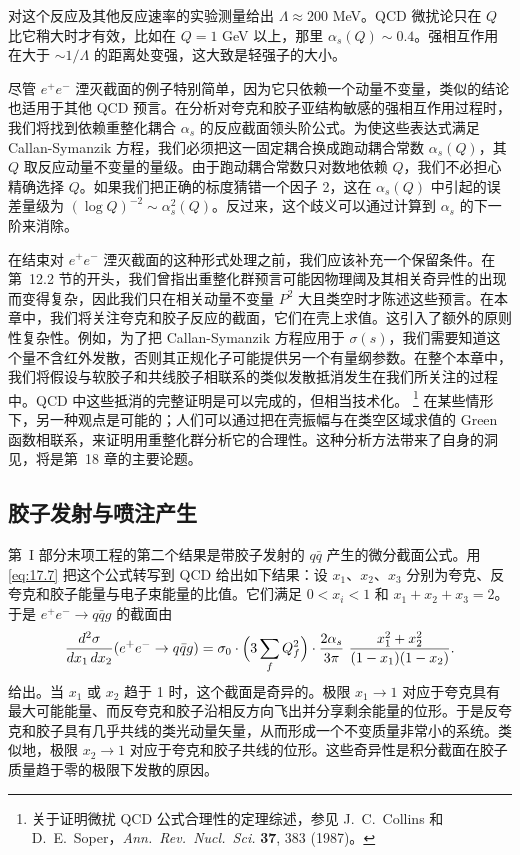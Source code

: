 对这个反应及其他反应速率的实验测量给出 $\Lambda \approx 200$ MeV。QCD 微扰论只在 $Q$ 比它稍大时才有效，比如在 $Q = 1$ GeV 以上，那里 $\alpha_s(Q) \sim 0.4$。强相互作用在大于 $\sim 1/\Lambda$ 的距离处变强，这大致是轻强子的大小。

尽管 $e^{+}e^{-}$ 湮灭截面的例子特别简单，因为它只依赖一个动量不变量，类似的结论也适用于其他 QCD 预言。在分析对夸克和胶子亚结构敏感的强相互作用过程时，我们将找到依赖重整化耦合 $\alpha_s$ 的反应截面领头阶公式。为使这些表达式满足 Callan-Symanzik 方程，我们必须把这一固定耦合换成跑动耦合常数 $\alpha_s(Q)$，其 $Q$ 取反应动量不变量的量级。由于跑动耦合常数只对数地依赖 $Q$，我们不必担心精确选择 $Q$。如果我们把正确的标度猜错一个因子 2，这在 $\alpha_s(Q)$ 中引起的误差量级为 $(\log Q)^{-2} \sim \alpha_s^2(Q)$。反过来，这个歧义可以通过计算到 $\alpha_s$ 的下一阶来消除。

在结束对 $e^{+}e^{-}$ 湮灭截面的这种形式处理之前，我们应该补充一个保留条件。在第~12.2 节的开头，我们曾指出重整化群预言可能因物理阈及其相关奇异性的出现而变得复杂，因此我们只在相关动量不变量 $P^2$ 大且类空时才陈述这些预言。在本章中，我们将关注夸克和胶子反应的截面，它们在壳上求值。这引入了额外的原则性复杂性。例如，为了把 Callan-Symanzik 方程应用于 $\sigma(s)$，我们需要知道这个量不含红外发散，否则其正规化子可能提供另一个有量纲参数。在整个本章中，我们将假设与软胶子和共线胶子相联系的类似发散抵消发生在我们所关注的过程中。QCD 中这些抵消的完整证明是可以完成的，但相当技术化。%
\footnote{关于证明微扰 QCD 公式合理性的定理综述，参见 J.~C.~Collins 和 D.~E.~Soper，\emph{Ann.\ Rev.\ Nucl.\ Sci.} \textbf{37}, 383 (1987)。} 在某些情形下，另一种观点是可能的；人们可以通过把在壳振幅与在类空区域求值的 Green 函数相联系，来证明用重整化群分析它的合理性。这种分析方法带来了自身的洞见，将是第~18 章的主要论题。

\subsection{胶子发射与喷注产生}

第~I 部分末项工程的第二个结果是带胶子发射的 $q\bar{q}$ 产生的微分截面公式。用 \eqref{eq:17.7} 把这个公式转写到 QCD 给出如下结果：设 $x_1$、$x_2$、$x_3$ 分别为夸克、反夸克和胶子能量与电子束能量的比值。它们满足 $0 < x_i < 1$ 和 $x_1 + x_2 + x_3 = 2$。于是 $e^{+}e^{-}\to q\bar{q}g$ 的截面由
\begin{equation}
  \frac{d^2\sigma}{dx_1\,dx_2}(e^{+}e^{-}\to q\bar{q}g)
  = \sigma_0\cdot\Bigl( 3\sum_f Q_f^2 \Bigr)\cdot
    \frac{2\alpha_s}{3\pi}\ \frac{x_1^2+x_2^2}{(1-x_1)(1-x_2)} .
  \label{eq:17.18}
\end{equation}
给出。当 $x_1$ 或 $x_2$ 趋于 1 时，这个截面是奇异的。极限 $x_1\to 1$ 对应于夸克具有最大可能能量、而反夸克和胶子沿相反方向飞出并分享剩余能量的位形。于是反夸克和胶子具有几乎共线的类光动量矢量，从而形成一个不变质量非常小的系统。类似地，极限 $x_2\to 1$ 对应于夸克和胶子共线的位形。这些奇异性是积分截面在胶子质量趋于零的极限下发散的原因。

